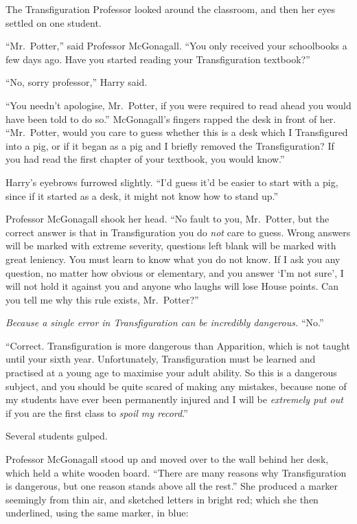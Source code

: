 The Transfiguration Professor looked around the classroom, and then her
eyes settled on one student.

``Mr.~Potter,'' said Professor McGonagall. ``You only received your
schoolbooks a few days ago. Have you started reading your
Transfiguration textbook?''

``No, sorry professor,'' Harry said.

``You needn't apologise, Mr.~Potter, if you were required to read ahead
you would have been told to do so.'' McGonagall's fingers rapped the
desk in front of her. ``Mr.~Potter, would you care to guess whether this
is a desk which I Transfigured into a pig, or if it began as a pig and I
briefly removed the Transfiguration? If you had read the first chapter
of your textbook, you would know.''

Harry's eyebrows furrowed slightly. ``I'd guess it'd be easier to start
with a pig, since if it started as a desk, it might not know how to
stand up.''

Professor McGonagall shook her head. ``No fault to you, Mr.~Potter, but
the correct answer is that in Transfiguration you do \emph{not} care to
guess. Wrong answers will be marked with extreme severity, questions
left blank will be marked with great leniency. You must learn to know
what you do not know. If I ask you any question, no matter how obvious
or elementary, and you answer `I'm not sure', I will not hold it against
you and anyone who laughs will lose House points. Can you tell me why
this rule exists, Mr.~Potter?''

\emph{Because a single error in Transfiguration can be incredibly
dangerous.} ``No.''

``Correct. Transfiguration is more dangerous than Apparition, which is
not taught until your sixth year. Unfortunately, Transfiguration must be
learned and practised at a young age to maximise your adult ability. So
this is a dangerous subject, and you should be quite scared of making
any mistakes, because none of my students have ever been permanently
injured and I will be \emph{extremely put out} if you are the first
class to \emph{spoil my record}.''

Several students gulped.

Professor McGonagall stood up and moved over to the wall behind her
desk, which held a white wooden board. ``There are many reasons why
Transfiguration is dangerous, but one reason stands above all the
rest.'' She produced a marker seemingly from thin air, and sketched
letters in bright red; which she then underlined, using the same marker,
in blue:

